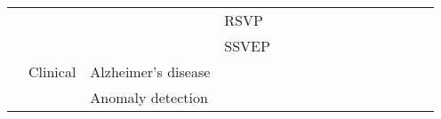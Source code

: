 \begin{tabular}{p{1.5cm}p{1.5cm}p{1.5cm}p{1.5cm}p{0.6cm}p{0.6cm}p{0.6cm}p{0.6cm}p{0.6cm}p{0.6cm}p{0.6cm}p{0.6cm}p{0.6cm}p{0.6cm}p{0.6cm}}
                                &                 &                   & RSVP &                                                             &                                                       \cite{Parekh2018, Zafar2017, Hajinoroozi2017, Manor2015, Cecotti2014} &                                                  \cite{Spampinato2017} &                                      &                                                            &                      &                         &                               &                     &                         &                                                                      \\
                                &                 &                   & SSVEP &                                    \cite{Perez-Benitez2018} &                                                                                   \cite{Aznan2018, Waytowich2018, kwak2017} &                                                                        &                                      &                                                            &                      &                         &                               &                     &                         &                                                                      \\
                                & Clinical & Alzheimer's disease &   &                                                             &                                                                                                         \cite{Morabito2016} &                                                                        &                                      &                                                            &                      &                         &                               &                     &                         &                                                                      \\
                                &                 & Anomaly detection &   &                                                             &                                                                                                                             &                                                                        &                    \cite{Wulsin2011} &                                                            &                      &                         &                               &                     &                         &                                                                      \\

\end{tabular}
